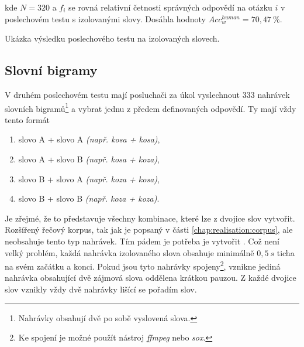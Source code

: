 \noindent kde $N=320$ a $f_i$ se rovná relativní četnosti správných odpovědí na otázku $i$ v poslechovém testu s izolovanými slovy. Dosáhla hodnoty $Acc_w^{human} = 70,47\ \%$.

\begin{table}[htpb]
  \centering
  \def\arraystretch{1.5}
  \caption{Ukázka výsledku poslechového testu na izolovaných slovech.}
  \label{tab:realisation:listening:isolated}
\end{table}

\subsection{Slovní bigramy}
\label{chap:realisation:listening:bigrams}

V druhém poslechovém testu mají posluchači za úkol vyslechnout $333$ nahrávek slovních bigramů\footnote{Nahrávky obsahují dvě po sobě vyslovená slova.} a vybrat jednu z předem definovaných odpovědí. Ty mají vždy tento formát

\begin{enumerate}[label=\alph*)]
  \item slovo A + slovo A \textit{(např. kosa + kosa)},
  \item slovo A + slovo B \textit{(např. kosa + koza)},
  \item slovo B + slovo A \textit{(např. koza + kosa)},
  \item slovo B + slovo B \textit{(např. koza + koza)}.
\end{enumerate}

\noindent Je zřejmé, že to představuje všechny kombinace, které lze z dvojice slov vytvořit. Rozšířený řečový korpus, tak jak je popsaný v části \ref{chap:realisation:corpus}, ale neobsahuje tento typ nahrávek. Tím pádem je potřeba je vytvořit . Což není velký problém, každá nahrávka izolovaného slova obsahuje minimálně $0,5\ s$ ticha na svém začátku a konci. Pokud jsou tyto nahrávky spojeny\footnote{Ke spojení je možné použít nástroj \textit{ffmpeg} nebo \textit{sox}.}, vznikne jediná nahrávka obsahující dvě zájmová slova oddělena krátkou pauzou. Z každé dvojice slov vznikly vždy dvě nahrávky lišící se pořadím slov.

